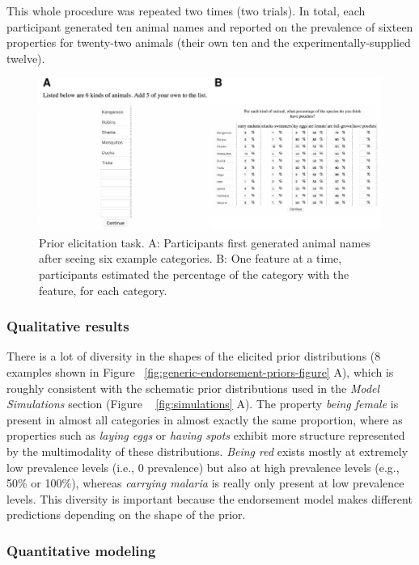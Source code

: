 \documentclass[english,floatsintext,man]{apa6}
\theoremstyle{definition}
\theoremstyle{definition}
\theoremstyle{definition}
\theoremstyle{remark}
\begin{document}
This whole procedure was repeated two times (two trials). In total, each
participant generated ten animal names and reported on the prevalence of
sixteen properties for twenty-two animals (their own ten and the
experimentally-supplied twelve).

\begin{figure}[htbp]
\centering
\includegraphics{figs/generics-prior-task-1.pdf}
\caption{\label{fig:generics-prior-task}Prior elicitation task. A:
Participants first generated animal names after seeing six example
categories. B: One feature at a time, participants estimated the
percentage of the category with the feature, for each category.}
\end{figure}

\subsubsection{Qualitative results}\label{qualitative-results}

There is a lot of diversity in the shapes of the elicited prior
distributions (8 examples shown in Figure~
\ref{fig:generic-endorsement-priors-figure} A), which is roughly
consistent with the schematic prior distributions used in the
\emph{Model Simulations} section (Figure ~ \ref{fig:simulations} A). The
property \emph{being female} is present in almost all categories in
almost exactly the same proportion, where as properties such as
\emph{laying eggs} or \emph{having spots} exhibit more structure
represented by the multimodality of these distributions. \emph{Being
red} exists mostly at extremely low prevalence levels (i.e., 0
prevalence) but also at high prevalence levels (e.g., 50\% or 100\%),
whereas \emph{carrying malaria} is really only present at low prevalence
levels. This diversity is important because the endorsement model makes
different predictions depending on the shape of the prior.

\subsubsection{Quantitative modeling}\label{quantitative-modeling}
\end{document}
